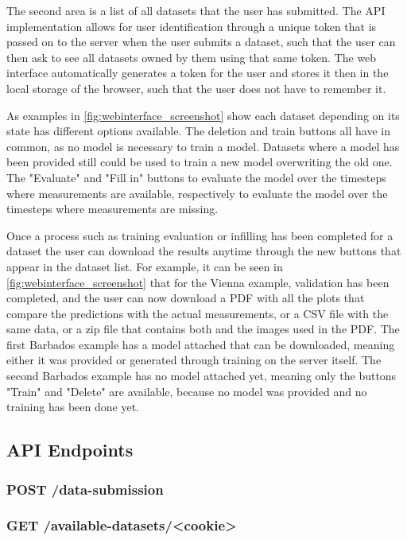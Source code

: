 The second area is a list of all datasets that the user has submitted. The API implementation allows for user identification through a unique token that is passed on to the server when the user submits a dataset, such that the user can then ask to see all datasets owned by them using that same token. The web interface automatically generates a token for the user and stores it then in the local storage of the browser, such that the user does not have to remember it.

As examples in \autoref{fig:webinterface_screenshot} show each dataset depending on its state has different options available. The deletion and train buttons all have in common, as no model is necessary to train a model. Datasets where a model has been provided still could be used to train a new model overwriting the old one. The "Evaluate" and "Fill in" buttons to evaluate the model over the timesteps where measurements are available, respectively to evaluate the model over the timesteps where measurements are missing.

Once a process such as training evaluation or infilling has been completed for a dataset the user can download the results anytime through the new buttons that appear in the dataset list. For example, it can be seen in \autoref{fig:webinterface_screenshot} that for the Vienna example, validation has been completed, and the user can now download a PDF with all the plots that compare the predictions with the actual measurements, or a CSV file with the same data, or a zip file that contains both and the images used in the PDF. The first Barbados example has a model attached that can be downloaded, meaning either it was provided or generated through training on the server itself. The second Barbados example has no model attached yet, meaning only the buttons "Train" and "Delete" are available, because no model was provided and no training has been done yet. 


\subsection{API Endpoints}
\label{sec:api}

\subsubsection*{POST /data-submission}

\subsubsection*{GET /available-datasets/<cookie>}

